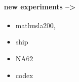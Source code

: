 \paragraph{new experiments -->}
\begin{itemize}
\item mathusla200,
\item ship
\item NA62
\item codex
\end{itemize}






\vspace {5cm}












